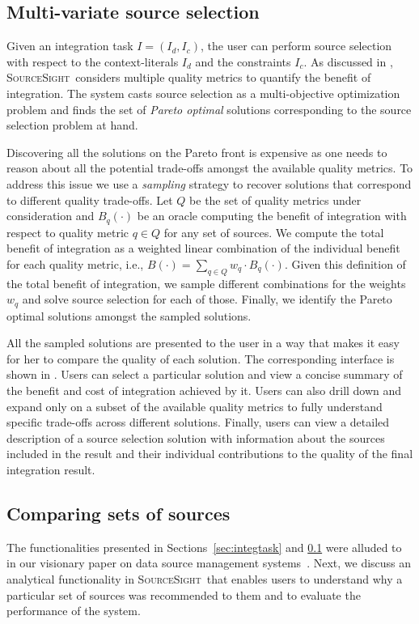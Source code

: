\documentclass{vldb}
\newcommand\system{\textsc{SourceSight}}
\begin{document}
\subsection{Multi-variate source selection}
\label{sec:sourcesel}
Given an integration task $I = (I_d,I_c)$, the user can perform source selection with respect to the context-literals $I_d$ and the constraints $I_c$. As discussed in , \system~considers multiple quality metrics to quantify the benefit of integration. The system casts source selection as a multi-objective optimization problem and finds the set of {\em Pareto optimal} solutions corresponding to the source selection problem at hand. 

Discovering all the solutions on the Pareto front is expensive as one needs to reason about all the potential trade-offs amongst the available quality metrics. To address this issue we use a {\em sampling} strategy to recover solutions that correspond to different quality trade-offs. Let $Q$ be the set of quality metrics under consideration and $B_q(\cdot)$ be an oracle computing the benefit of integration with respect to quality metric $q \in Q$ for any set of sources. We compute the total benefit of integration as a weighted linear combination of the individual benefit for each quality metric, i.e., $B(\cdot) = \sum_{q \in Q} w_q \cdot B_q(\cdot)$. Given this definition of the total benefit of integration, we sample different combinations for the weights $w_q$ and solve source selection for each of those. Finally, we identify the Pareto optimal solutions amongst the sampled solutions. 

All the sampled solutions are presented to the user in a way that makes it easy for her to compare the quality of each solution. The corresponding interface is shown in . Users can select a particular solution and view a concise summary of the benefit and cost of integration achieved by it. Users can also drill down and expand only on a subset of the available quality metrics to fully understand specific trade-offs across different solutions. Finally, users can view a detailed description of a source selection solution with information about the sources included in the result and their individual contributions to the quality of the final integration result. 

\subsection{Comparing sets of sources}
\label{sec:extensions}
The functionalities presented in Sections~\ref{sec:integtask} and \ref{sec:sourcesel} were alluded to in our visionary paper on data source management systems~\cite{rekatsinas:2015}. Next, we discuss an analytical functionality in \system~that enables users to understand why a particular set of sources was recommended to them and to evaluate the performance of the system.
\end{document}

